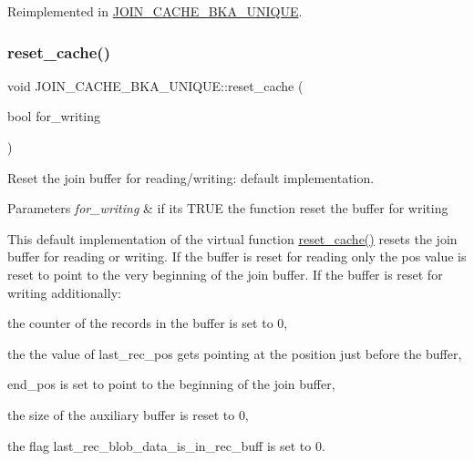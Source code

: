 Reimplemented in \mbox{\hyperlink{group__Query__Optimizer_gafb1afc6322b69d01ea68b677b715ddc7}{J\+O\+I\+N\+\_\+\+C\+A\+C\+H\+E\+\_\+\+B\+K\+A\+\_\+\+U\+N\+I\+Q\+UE}}.

\mbox{\label{group__Query__Optimizer_gafb1afc6322b69d01ea68b677b715ddc7}} 
\subsubsection{\texorpdfstring{reset\+\_\+cache()}{reset\_cache()}\hspace{0.1cm}{\footnotesize\ttfamily [2/2]}}
{\footnotesize\ttfamily void J\+O\+I\+N\+\_\+\+C\+A\+C\+H\+E\+\_\+\+B\+K\+A\+\_\+\+U\+N\+I\+Q\+U\+E\+::reset\+\_\+cache (\begin{DoxyParamCaption}\item[{bool}]{for\+\_\+writing }\end{DoxyParamCaption})\hspace{0.3cm}{\ttfamily [virtual]}}



Reset the join buffer for reading/writing\+: default implementation. 


\begin{DoxyParams}{Parameters}
{\em for\+\_\+writing} & if it\textquotesingle{}s T\+R\+UE the function reset the buffer for writing\\
\hline
\end{DoxyParams}
This default implementation of the virtual function \mbox{\hyperlink{group__Query__Optimizer_gafb1afc6322b69d01ea68b677b715ddc7}{reset\+\_\+cache()}} resets the join buffer for reading or writing. If the buffer is reset for reading only the \textquotesingle{}pos\textquotesingle{} value is reset to point to the very beginning of the join buffer. If the buffer is reset for writing additionally\+:
\begin{DoxyItemize}
\item the counter of the records in the buffer is set to 0,
\item the the value of \textquotesingle{}last\+\_\+rec\+\_\+pos\textquotesingle{} gets pointing at the position just before the buffer,
\item \textquotesingle{}end\+\_\+pos\textquotesingle{} is set to point to the beginning of the join buffer,
\item the size of the auxiliary buffer is reset to 0,
\item the flag \textquotesingle{}last\+\_\+rec\+\_\+blob\+\_\+data\+\_\+is\+\_\+in\+\_\+rec\+\_\+buff\textquotesingle{} is set to 0. 
\end{DoxyItemize}

